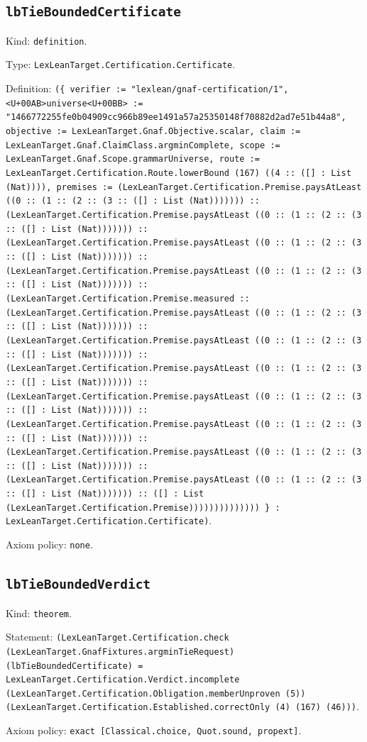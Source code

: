 \documentclass[11pt]{article}
\begin{document}
\subsection*{\texttt{lbTieBoundedCertificate}}
\noindent Kind: \texttt{definition}.\par
\noindent Type: \texttt{LexLeanTarget.Certification.Certificate}.\par
\noindent Definition: \texttt{(\{ verifier := "lexlean/gnaf-certification/1", <U+00AB>universe<U+00BB> := "1466772255fe0b04909cc966b89ee1491a57a25350148f70882d2ad7e51b44a8", objective := LexLeanTarget.Gnaf.Objective.scalar, claim := LexLeanTarget.Gnaf.ClaimClass.argminComplete, scope := LexLeanTarget.Gnaf.Scope.grammarUniverse, route := LexLeanTarget.Certification.Route.lowerBound (167) ((4 :: ([] : List (Nat)))), premises := (LexLeanTarget.Certification.Premise.paysAtLeast ((0 :: (1 :: (2 :: (3 :: ([] : List (Nat))))))) :: (LexLeanTarget.Certification.Premise.paysAtLeast ((0 :: (1 :: (2 :: (3 :: ([] : List (Nat))))))) :: (LexLeanTarget.Certification.Premise.paysAtLeast ((0 :: (1 :: (2 :: (3 :: ([] : List (Nat))))))) :: (LexLeanTarget.Certification.Premise.paysAtLeast ((0 :: (1 :: (2 :: (3 :: ([] : List (Nat))))))) :: (LexLeanTarget.Certification.Premise.measured :: (LexLeanTarget.Certification.Premise.paysAtLeast ((0 :: (1 :: (2 :: (3 :: ([] : List (Nat))))))) :: (LexLeanTarget.Certification.Premise.paysAtLeast ((0 :: (1 :: (2 :: (3 :: ([] : List (Nat))))))) :: (LexLeanTarget.Certification.Premise.paysAtLeast ((0 :: (1 :: (2 :: (3 :: ([] : List (Nat))))))) :: (LexLeanTarget.Certification.Premise.paysAtLeast ((0 :: (1 :: (2 :: (3 :: ([] : List (Nat))))))) :: (LexLeanTarget.Certification.Premise.paysAtLeast ((0 :: (1 :: (2 :: (3 :: ([] : List (Nat))))))) :: (LexLeanTarget.Certification.Premise.paysAtLeast ((0 :: (1 :: (2 :: (3 :: ([] : List (Nat))))))) :: (LexLeanTarget.Certification.Premise.paysAtLeast ((0 :: (1 :: (2 :: (3 :: ([] : List (Nat))))))) :: ([] : List (LexLeanTarget.Certification.Premise)))))))))))))) \} : LexLeanTarget.Certification.Certificate)}.\par
\noindent Axiom policy: \texttt{none}.\par
\subsection*{\texttt{lbTieBoundedVerdict}}
\noindent Kind: \texttt{theorem}.\par
\noindent Statement: \texttt{(LexLeanTarget.Certification.check (LexLeanTarget.GnafFixtures.argminTieRequest) (lbTieBoundedCertificate) = LexLeanTarget.Certification.Verdict.incomplete (LexLeanTarget.Certification.Obligation.memberUnproven (5)) (LexLeanTarget.Certification.Established.correctOnly (4) (167) (46)))}.\par
\noindent Axiom policy: \texttt{exact [Classical.choice, Quot.sound, propext]}.\par
\end{document}
